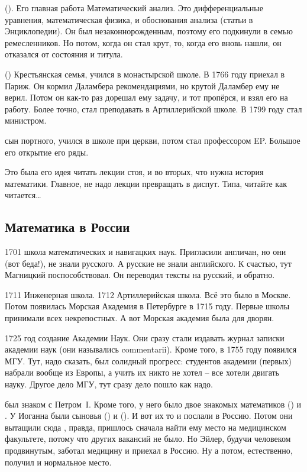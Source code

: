 \documentclass[a4paper,oneside,fleqn,10pt]{article}
\begin{document}
 (). Его главная работа Математический
анализ.  Это дифференциальные уравнения, математическая физика, и
обоснования анализа (статьи в Энциклопедии).  Он был
незаконнорожденным, поэтому его подкинули в семью ремесленников.  Но
потом, когда он стал крут, то, когда его вновь нашли, он отказался от
состояния и титула.

 () Крестьянская семья, учился в
монастырской школе.  В 1766 году приехал в Париж. Он кормил Даламбера
рекомендациями, но крутой Даламбер ему не верил. Потом он как-то раз
дорешал ему задачу, и тот пропёрся, и взял его на работу.  Более
точно, стал преподавать в Артиллерийской школе. В 1799 году стал
министром.

  сын портного, учился в школе при церкви,
потом стал профессором EP.  Большое его открытие его ряды.

Это была его идея читать лекции стоя, и во вторых, что нужна история
математики.  Главное, не надо лекции превращать в диспут. Типа,
читайте как читается\ldots

\subsection{Математика в России}

1701 школа математических и навигацких наук.  Пригласили англичан, но
они (вот беда!), не знали русского. А русские не знали английского. К
счастью, тут Магницкий поспособствовал. Он переводил тексты на
русский, и обратно.

1711 Инженерная школа. 1712 Артиллерийская школа. Всё это было в
Москве.  Потом появилась Морская Академия в Петербурге в 1715
году. Первые школы принимали всех некрепостных. А вот Морская академия
была для дворян.

1725 год создание Академии Наук. Они сразу стали издавать журнал
записки академии наук (они назывались commentarii). Кроме того, в 1755
году появился МГУ. Тут, надо сказать, был солидный прогресс: студентов
академии (первых) набрали вообще из Европы, а учить их никто не хотел
-- все хотели двигать науку.  Другое дело МГУ, тут сразу дело пошло как
надо.

 был знаком с Петром~I. Кроме того, у него было двое
знакомых математиков 
() и .  У Иоганна
были сыновья  () и
 (). И вот их то и
послали в Россию.  Потом они вытащили сюда ,
правда, пришлось сначала найти ему место на медицинском факультете,
потому что других вакансий не было. Но Эйлер, будучи человеком
продвинутым, заботал медицину и приехал в Россию. Ну а потом,
естественно, получил и нормальное место.
\end{document}
